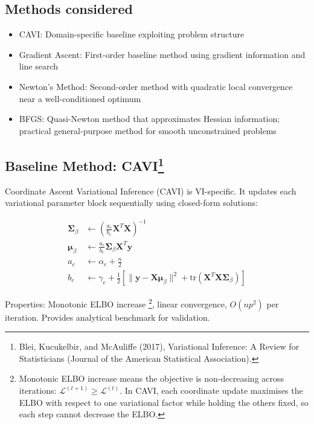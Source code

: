 \documentclass[11pt]{article}
\newcommand{\tr}{\text{tr}}
\begin{document}
\subsection*{Methods considered}

\begin{itemize}
\item CAVI: Domain-specific baseline exploiting problem structure
\item Gradient Ascent: First-order baseline method using gradient information and line search
\item Newton's Method: Second-order method with quadratic local convergence near a well-conditioned optimum
\item BFGS: Quasi-Newton method that approximates Hessian information; practical general-purpose method for smooth unconstrained problems
\end{itemize}

\subsection*{Baseline Method: CAVI\footnote{Blei, Kucukelbir, and McAuliffe (2017), Variational Inference: A Review for Statisticians (Journal of the American Statistical Association).}}

Coordinate Ascent Variational Inference (CAVI) is VI-specific. It updates each variational parameter block sequentially using closed-form solutions:

\begin{align}
\bm{\Sigma}_\beta &\leftarrow \left(\frac{a_e}{b_e} \bm{X}^T\bm{X}\right)^{-1}\\
\bm{\mu}_\beta &\leftarrow \frac{a_e}{b_e} \bm{\Sigma}_\beta \bm{X}^T\bm{y}\\
a_e &\leftarrow \alpha_e + \frac{n}{2}\\
b_e &\leftarrow \gamma_e + \frac{1}{2}\left[\|\bm{y} - \bm{X}\bm{\mu}_\beta\|^2 + \tr(\bm{X}^T\bm{X}\bm{\Sigma}_\beta)\right]
\end{align}

Properties: Monotonic ELBO increase \footnote{Monotonic ELBO increase means the objective is non-decreasing across iterations: $\mathcal{L}^{(t+1)} \ge \mathcal{L}^{(t)}$. In CAVI, each coordinate update maximises the ELBO with respect to one variational factor while holding the others fixed, so each step cannot decrease the ELBO.}, linear convergence, $O(np^2)$ per iteration. Provides analytical benchmark for validation.


\newpage 
\end{document}
